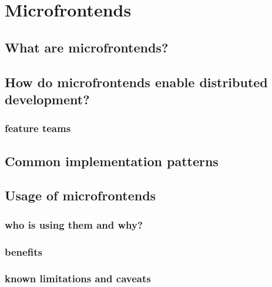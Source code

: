 \section{Microfrontends}
\subsection{What are microfrontends?}
\subsection{How do microfrontends enable distributed development?}
    \subsubsection{feature teams}
\subsection{Common implementation patterns}
\subsection{Usage of microfrontends}
    \subsubsection{who is using them and why?}
    \subsubsection{benefits}
    \subsubsection{known limitations and caveats}